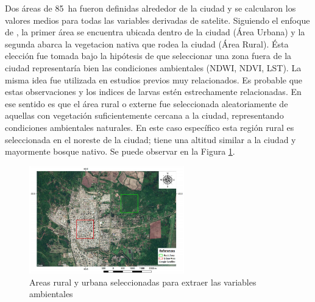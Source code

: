   \par Dos áreas de \SI{85}{\hectare} fueron definidas alrededor de la ciudad
    y se calcularon los valores medios para todas las variables derivadas de
    satelite. Siguiendo el enfoque de
    \cite{models_predicting, dynamics_of_dengue, temporal_modeling},
    la primer área se encuentra ubicada dentro de la ciudad
    (Área Urbana) y la segunda abarca la vegetacion nativa que rodea la ciudad
    (Área Rural). Ésta elección fue tomada bajo la hipótesis de que seleccionar
    una zona fuera de la ciudad representaría bien las condiciones ambientales
    (NDWI, NDVI, LST). La misma idea fue utilizada en estudios previos muy
    relacionados. Es probable que estas observaciones y los indices de larvas
    estén estrechamente relacionadas. En ese sentido es que el área rural o
    externe fue seleccionada aleatoriamente de aquellas con vegetación suficientemente
    cercana a la ciudad, representando condiciones ambientales naturales.
    En este caso específico esta región rural es seleccionada en el
    noreste de la ciudad; tiene una altitud similar a la ciudad y mayormente
    bosque nativo. Se puede observar en la Figura \ref{fig:zones}.
    \begin{figure}[hbt]
    \centering%
    \includegraphics[width=0.6\textwidth]{images/zones}%
    \caption{Areas rural y urbana seleccionadas para extraer las variables ambientales}\label{fig:zones}
    \end{figure}



